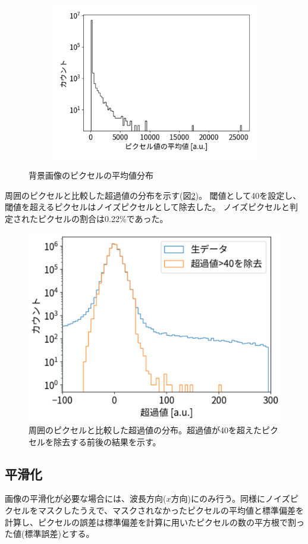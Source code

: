 \documentclass[a4paper,11pt,uplatex]{jsbook}
\begin{document}
\begin{figure}[H]
  \hfill
  \begin{subfigure}[b]{0.45\linewidth}
    \centering
    \includegraphics[width=\linewidth]{image/4-BGmeanall.png}
  \end{subfigure}
  \caption[背景画像の光量分布]{背景画像のピクセルの平均値分布}\label{BGmean}
\end{figure}

周囲のピクセルと比較した超過値の分布を示す(図\ref{excess})。
閾値として40を設定し、閾値を超えるピクセルはノイズピクセルとして除去した。
ノイズピクセルと判定されたピクセルの割合は0.22\%であった。
\begin{figure}[H]
  \centering
  \includegraphics[width=0.5\linewidth]{image/4-excess.png}
  \caption[超過値の分布]{周囲のピクセルと比較した超過値の分布。超過値が40を超えたピクセルを除去する前後の結果を示す。}\label{excess}
\end{figure}
\subsection{平滑化}
画像の平滑化が必要な場合には、波長方向($x$方向)にのみ行う。同様にノイズピクセルをマスクしたうえで、マスクされなかったピクセルの平均値と標準偏差を計算し、ピクセルの誤差は標準偏差を計算に用いたピクセルの数の平方根で割った値(標準誤差)とする。
\end{document}
